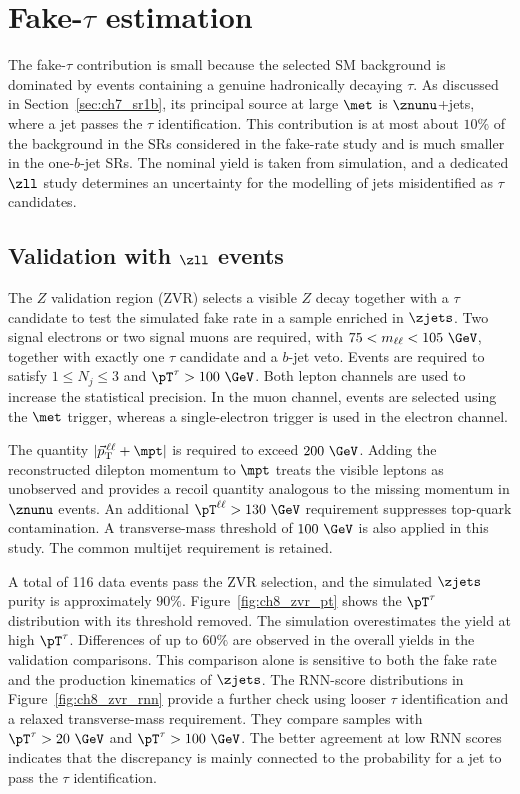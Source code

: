 
\clearpage
\section[Fake-tau estimation]{Fake-$\tau$ estimation}
\label{sec:ch8_fake}

The fake-$\tau$ contribution is small because the selected SM background is dominated by events containing a genuine hadronically decaying $\tau$.
As discussed in Section~\ref{sec:ch7_sr1b}, its principal source at large $\met$ is $\znunu$+jets, where a jet passes the $\tau$ identification.
This contribution is at most about $10\%$ of the background in the SRs considered in the fake-rate study and is much smaller in the one-$b$-jet SRs.
The nominal yield is taken from simulation, and a dedicated $\zll$ study determines an uncertainty for the modelling of jets misidentified as $\tau$ candidates.

\subsection[Validation with Z dilepton events]{Validation with $\zll$ events}
\label{subsec:ch8_zvr}

The $Z$ validation region (ZVR) selects a visible $Z$ decay together with a $\tau$ candidate to test the simulated fake rate in a sample enriched in $\zjets$.
Two signal electrons or two signal muons are required, with $75<m_{\ell\ell}<105~\GeV$, together with exactly one $\tau$ candidate and a $b$-jet veto.
Events are required to satisfy $1\leq N_j\leq3$ and $\pT^\tau>100~\GeV$.
Both lepton channels are used to increase the statistical precision.
In the muon channel, events are selected using the $\met$ trigger, whereas a single-electron trigger is used in the electron channel.

The quantity $|\vec p_{\mathrm{T}}^{\,\ell\ell}+\mpt|$ is required to exceed $200~\GeV$.
Adding the reconstructed dilepton momentum to $\mpt$ treats the visible leptons as unobserved and provides a recoil quantity analogous to the missing momentum in $\znunu$ events.
An additional $\pT^{\ell\ell}>130~\GeV$ requirement suppresses top-quark contamination.
A transverse-mass threshold of $100~\GeV$ is also applied in this study.
The common multijet requirement is retained.

A total of 116 data events pass the ZVR selection, and the simulated $\zjets$ purity is approximately $90\%$.
Figure~\ref{fig:ch8_zvr_pt} shows the $\pT^\tau$ distribution with its threshold removed.
The simulation overestimates the yield at high $\pT^\tau$.
Differences of up to $60\%$ are observed in the overall yields in the validation comparisons.
This comparison alone is sensitive to both the fake rate and the production kinematics of $\zjets$.
The RNN-score distributions in Figure~\ref{fig:ch8_zvr_rnn} provide a further check using looser $\tau$ identification and a relaxed transverse-mass requirement.
They compare samples with $\pT^\tau>20~\GeV$ and $\pT^\tau>100~\GeV$.
The better agreement at low RNN scores indicates that the discrepancy is mainly connected to the probability for a jet to pass the $\tau$ identification.

